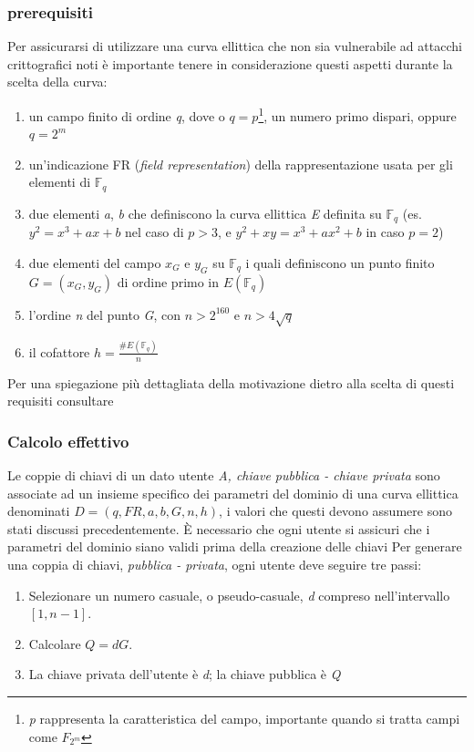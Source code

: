 \documentclass[12pt, a4paper]{report}
\begin{document}
\subsubsection{prerequisiti}
Per assicurarsi di utilizzare una curva ellittica che non sia vulnerabile ad attacchi crittografici noti è importante tenere in considerazione questi aspetti durante la scelta della curva:
\begin{enumerate}
    \item un campo finito di ordine \textit{q}, dove o $q = p$\footnote{\textit{p} rappresenta la caratteristica del campo, importante quando si tratta campi come $F_{2^m}$}, un numero primo dispari, oppure $q = 2^m$
    \item un'indicazione FR (\textit{field representation}) della rappresentazione usata per gli elementi di $\mathbb{F}_q$
    \item due elementi \textit{a}, \textit{b} che definiscono la curva ellittica \textit{E} definita su $\mathbb{F}_q$ (es. $y^2 = x^3 + ax + b$ nel caso di $p > 3$, e $y^2 + xy = x^3 + ax^2 + b$ in caso $p = 2$)
    \item due elementi del campo $x_G$ e $y_G$ su $\mathbb{F}_q$ i quali definiscono un punto finito $G = (x_G, y_G)$ di ordine primo in $E(\mathbb{F}_q)$
    \item l'ordine \textit{n} del punto \textit{G}, con $n > 2^{160}$ e $n > 4\sqrt{q}$
    \item il cofattore $h = \frac{\#E(\mathbb{F}_q)}{n}$
\end{enumerate}
Per una spiegazione più dettagliata della motivazione dietro alla scelta di questi requisiti consultare \cite{Johnson}

\subsubsection{Calcolo effettivo}
Le coppie di chiavi di un dato utente \textit{A, chiave pubblica - chiave privata} sono associate ad un insieme specifico dei parametri del dominio di una curva ellittica denominati $D = (q, FR, a, b, G, n, h)$, i valori che questi devono assumere sono stati discussi precedentemente. È necessario che ogni utente si assicuri che i parametri del dominio siano validi prima della creazione delle chiavi \cite{Johnson}
Per generare una coppia di chiavi, \textit{pubblica - privata}, ogni utente deve seguire tre passi:
\begin{enumerate}
    \item Selezionare un numero casuale, o pseudo-casuale, \textit{d} compreso nell'intervallo $[1, n - 1]$.
    \item Calcolare $Q = dG$.
    \item La chiave privata dell'utente è \textit{d}; la chiave pubblica è \textit{Q}
\end{enumerate}
\end{document}

